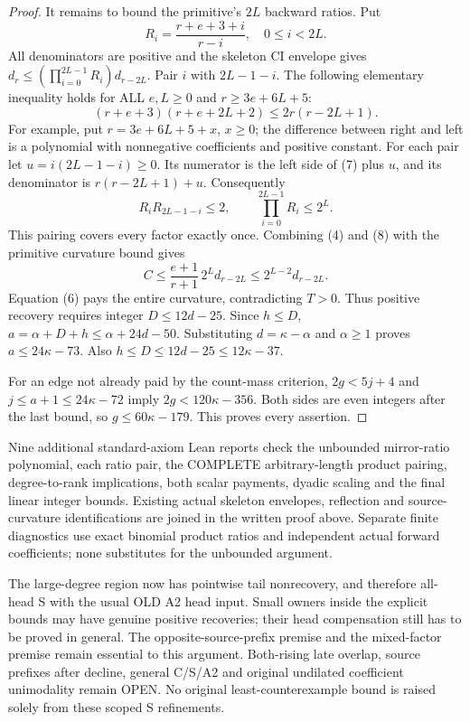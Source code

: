 \begin{proof}
It remains to bound the primitive's $2L$ backward ratios. Put
\[
       R_i=\frac{r+e+3+i}{r-i},\quad0\le i<2L.
\]
All denominators are positive and the skeleton CI envelope gives
$d_r\le(\prod_{i=0}^{2L-1}R_i)d_{r-2L}$.
Pair $i$ with $2L-1-i$. The following elementary inequality holds
for ALL $e,L\ge0$ and $r\ge3e+6L+5$:
\[
       (r+e+3)(r+e+2L+2)\le2r(r-2L+1).               \tag{7}
\]
For example, put $r=3e+6L+5+x$, $x\ge0$; the difference
between right and left is a polynomial with nonnegative
coefficients and positive constant. For each pair let
$u=i(2L-1-i)\ge0$. Its numerator is the left side of (7)
plus $u$, and its denominator is $r(r-2L+1)+u$.
Consequently
\[
             R_iR_{2L-1-i}\le2,
             \qquad\prod_{i=0}^{2L-1}R_i\le2^L.       \tag{8}
\]
This pairing covers every factor exactly once. Combining (4)
and (8) with the primitive curvature bound gives
\[
       C\le\frac{e+1}{r+1}\,2^L d_{r-2L}
          \le2^{L-2}d_{r-2L}.
\]
Equation (6) pays the entire curvature, contradicting $T>0$.
Thus positive recovery requires integer $D\le12d-25$.
Since $h\le D$, $a=\alpha+D+h\le\alpha+24d-50$.
Substituting $d=\kappa-\alpha$ and $\alpha\ge1$ proves
$a\le24\kappa-73$. Also $h\le D\le12d-25\le12\kappa-37$.

For an edge not already paid by the count-mass criterion,
$2g<5j+4$ and $j\le a+1\le24\kappa-72$ imply
$2g<120\kappa-356$. Both sides are even integers after the
last bound, so $g\le60\kappa-179$.
This proves every assertion.
\end{proof}

Nine additional standard-axiom Lean reports check the unbounded
mirror-ratio polynomial, each ratio pair, the COMPLETE arbitrary-length
product pairing, degree-to-rank implications, both scalar payments,
dyadic scaling and the final linear integer bounds. Existing actual
skeleton envelopes, reflection and source-curvature identifications
are joined in the written proof above. Separate finite diagnostics
use exact binomial product ratios and independent actual forward
coefficients; none substitutes for the unbounded argument.

The large-degree region now has pointwise tail nonrecovery, and
therefore all-head S with the usual OLD A2 head input. Small owners
inside the explicit bounds may have genuine positive recoveries;
their head compensation still has to be proved in general.
The opposite-source-prefix premise and the mixed-factor premise
remain essential to this argument. Both-rising late overlap, source
prefixes after decline, general C/S/A2 and original undilated
coefficient unimodality remain OPEN. No original least-counterexample
bound is raised solely from these scoped S refinements.
